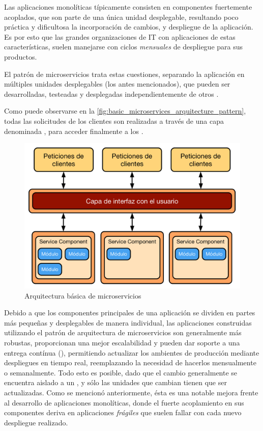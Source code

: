Las aplicaciones monolíticas típicamente consisten en componentes fuertemente acoplados, que son parte de una única unidad desplegable, resultando poco práctica y dificultosa la incorporación de cambios,  y despliegue de la aplicación. Es por esto que las grandes organizaciones de IT con aplicaciones de estas características, suelen manejarse con ciclos \textit{mensuales} de despliegue para sus productos.

El patrón de microservicios trata estas cuestiones, separando la aplicación en múltiples unidades desplegables (los  antes mencionados), que pueden ser desarrolladas, testeadas y desplegadas independientemente de otros .\cite[p.~27]{richards2015}

Como puede observarse en la \autoref{fig:basic_microservices_arquitecture_pattern}, todas las solicitudes de los clientes son realizadas a través de una capa denominada , para acceder finalmente a los .

\begin{figure}[H]
  \includegraphics[width=\linewidth]{src/images/02-capitulo-2/arquitectura-microservicios-basica.png}
  \caption{Arquitectura básica de microservicios}
  \label{fig:basic_microservices_arquitecture_pattern}
\end{figure}

Debido a que los componentes principales de una aplicación se dividen en partes más pequeñas y desplegables de manera individual, las aplicaciones construidas utilizando el patrón de arquitectura de microservicios son generalmente más robustas, proporcionan una mejor escalabilidad y pueden dar soporte a una entrega contínua (), permitiendo actualizar los ambientes de producción mediante despliegues en tiempo real, reemplazando la necesidad de hacerlos mensualmente o semanalmente. \cite[p.~33]{richards2015} Todo esto es posible, dado que el cambio generalmente se encuentra aislado a un , y sólo las unidades que cambian tienen que ser actualizadas. Como se mencionó anteriormente, ésta es una notable mejora frente al desarrollo de aplicaciones monolíticas, donde el fuerte acoplamiento en sus componentes deriva en aplicaciones \textit{frágiles} que suelen fallar con cada nuevo despliegue realizado.

